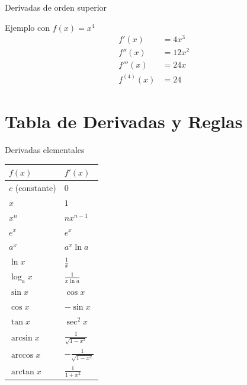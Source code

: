 \documentclass[aspectratio=169, 10pt, xcolor=table]{beamer}
\begin{document}
\begin{frame}{Derivadas de orden superior}
    \begin{exampleblock}{Ejemplo con $f(x)=x^4$}
        \begin{align*}
            f'(x) &= 4x^3 \\
            f''(x) &= 12x^2 \\
            f'''(x) &= 24x \\
            f^{(4)}(x) &= 24
        \end{align*}
    \end{exampleblock}
\end{frame}

\section{Tabla de Derivadas y Reglas}

\begin{frame}{Derivadas elementales}
    \begin{table}
        \centering
        \begin{tabular}{l|l}
            \toprule
            $f(x)$ & $f'(x)$ \\
            \midrule
            $c$ (constante) & $0$ \\
            $x$ & $1$ \\
            $x^n$ & $n x^{n-1}$ \\
            $e^x$ & $e^x$ \\
            $a^x$ & $a^x \ln a$ \\
            $\ln x$ & $\frac{1}{x}$ \\
            $\log_a x$ & $\frac{1}{x \ln a}$ \\
            $\sin x$ & $\cos x$ \\
            $\cos x$ & $-\sin x$ \\
            $\tan x$ & $\sec^2 x$ \\
            $\arcsin x$ & $\frac{1}{\sqrt{1-x^2}}$ \\
            $\arccos x$ & $-\frac{1}{\sqrt{1-x^2}}$ \\
            $\arctan x$ & $\frac{1}{1+x^2}$ \\
            \bottomrule
        \end{tabular}
    \end{table}
\end{frame}
\end{document}
